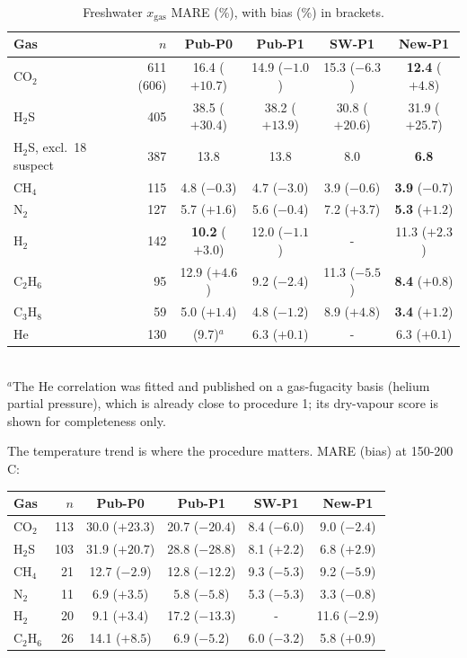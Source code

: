 \documentclass[10pt,a4paper]{article}
\begin{document}
\begin{table}[h]\centering\small
\caption{Freshwater $x_{\mathrm{gas}}$ MARE (\%), with bias (\%) in brackets.}\label{tab:fresh}
\begin{tabular}{lrcccc}
\toprule
Gas & $n$ & Pub-P0 & Pub-P1 & SW-P1 & New-P1 \\
\midrule
CO$_2$ & 611 (606) & 16.4 ($+10.7$) & 14.9 ($-1.0$) & 15.3 ($-6.3$) & \textbf{12.4} ($+4.8$) \\
H$_2$S & 405 & 38.5 ($+30.4$) & 38.2 ($+13.9$) & 30.8 ($+20.6$) & 31.9 ($+25.7$) \\
H$_2$S, excl.\ 18 suspect & 387 & 13.8 & 13.8 & 8.0 & \textbf{6.8} \\
CH$_4$ & 115 & 4.8 ($-0.3$) & 4.7 ($-3.0$) & 3.9 ($-0.6$) & \textbf{3.9} ($-0.7$) \\
N$_2$ & 127 & 5.7 ($+1.6$) & 5.6 ($-0.4$) & 7.2 ($+3.7$) & \textbf{5.3} ($+1.2$) \\
H$_2$ & 142 & \textbf{10.2} ($+3.0$) & 12.0 ($-1.1$) & - & 11.3 ($+2.3$) \\
C$_2$H$_6$ & 95 & 12.9 ($+4.6$) & 9.2 ($-2.4$) & 11.3 ($-5.5$) & \textbf{8.4} ($+0.8$) \\
C$_3$H$_8$ & 59 & 5.0 ($+1.4$) & 4.8 ($-1.2$) & 8.9 ($+4.8$) & \textbf{3.4} ($+1.2$) \\
He & 130 & (9.7)$^{a}$ & 6.3 ($+0.1$) & - & 6.3 ($+0.1$) \\
\bottomrule
\end{tabular}\\[2pt]
\footnotesize $^{a}$The He correlation was fitted and published on a gas-fugacity basis (helium partial pressure), which is already close to procedure 1; its dry-vapour score is shown for completeness only.
\end{table}

The temperature trend is where the procedure matters. MARE (bias) at 150-200\,\textdegree C:

\begin{center}\small
\begin{tabular}{lrcccc}
\toprule
Gas & $n$ & Pub-P0 & Pub-P1 & SW-P1 & New-P1 \\
\midrule
CO$_2$ & 113 & 30.0 ($+23.3$) & 20.7 ($-20.4$) & 8.4 ($-6.0$) & 9.0 ($-2.4$) \\
H$_2$S & 103 & 31.9 ($+20.7$) & 28.8 ($-28.8$) & 8.1 ($+2.2$) & 6.8 ($+2.9$) \\
CH$_4$ & 21 & 12.7 ($-2.9$) & 12.8 ($-12.2$) & 9.3 ($-5.3$) & 9.2 ($-5.9$) \\
N$_2$ & 11 & 6.9 ($+3.5$) & 5.8 ($-5.8$) & 5.3 ($-5.3$) & 3.3 ($-0.8$) \\
H$_2$ & 20 & 9.1 ($+3.4$) & 17.2 ($-13.3$) & - & 11.6 ($-2.9$) \\
C$_2$H$_6$ & 26 & 14.1 ($+8.5$) & 6.9 ($-5.2$) & 6.0 ($-3.2$) & 5.8 ($+0.9$) \\
\bottomrule
\end{tabular}
\end{center}
\end{document}
